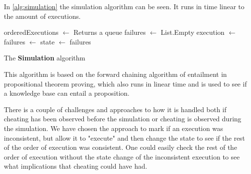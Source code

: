 	\newpar In \autoref{alg:simulation} the simulation algorithm can be seen. It runs in time linear to the amount of executions.
	
	
	\begin{algorithm}[H]
		\begin{algorithmic}
			\State orderedExecutions $\leftarrow$  \Comment Returns a queue
			\State failures $\leftarrow$ List.Empty
				\State execution $\leftarrow$ 
					\State failures $\leftarrow$ 
				\EndIf
				\State state $\leftarrow$ 
			\EndWhile
			\State\Return failures
			\EndFunction
		\end{algorithmic}
		\caption{The \textbf{Simulation} algorithm}
		\label{alg:simulation}
	\end{algorithm}
	
	\newpar This algorithm is based on the forward chaining algorithm of entailment in propositional theorem proving, which also runs in linear time and is used to see if a knowledge base can entail a proposition.
	
    \newpar There is a couple of challenges and approaches to how it is handled both if cheating has been observed before the simulation or cheating is observed during the simulation. We have chosen the approach to mark if an execution was inconsistent, but allow it to "execute" and then change the state to see if the rest of the order of execution was consistent. One could easily check the rest of the order of execution without the state change of the inconsistent execution to see what implications that cheating could have had.
    
